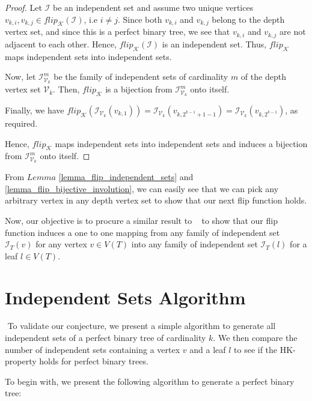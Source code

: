 \documentclass{amsart}
\theoremstyle{definition}
\begin{document}
\begin{proof}
  Let $\mathcal{I}$ be an independent set and assume two unique vertices $v_{k, i}, v_{k, j} \in flip_\mathcal{K}(\mathcal{I})$, i.e $i \neq j$. Since both $v_{k, i}$ and $v_{k, j}$ belong to the depth vertex set, and since this is a perfect binary tree, we see that $v_{k, i}$ and $v_{k, j}$ are not adjacent to each other. Hence, $flip_\mathcal{K}(\mathcal{I})$ is an independent set. Thus, $flip_\mathcal{K}$ maps independent sets into independent sets.

  Now, let $\mathcal{I}^m_{\mathcal{V}_k}$ be the family of independent sets of cardinality $m$ of the depth vertex set $\mathcal{V}_k$. Then, $flip_\mathcal{K}$ is a bijection from $\mathcal{I}^m_{\mathcal{V}_k}$ onto itself.

  Finally, we have $flip_\mathcal{K}(\mathcal{I}_{\mathcal{V}_k}(v_{k, 1})) = \mathcal{I}_{\mathcal{V}_k}(v_{k, 2^{k-1} + 1 - 1}) = \mathcal{I}_{\mathcal{V}_k}(v_{k, 2^{k-1}})$, as required.

  Hence, $flip_\mathcal{K}$ maps independent sets into independent sets and induces a bijection from $\mathcal{I}^m_{\mathcal{V}_k}$ onto itself.
\end{proof}

From $Lemma$ \ref{lemma_flip_independent_sets} and \ref{lemma_flip_bijective_involution}, we can easily see that we can pick any arbitrary vertex in any depth vertex set to show that our next flip function holds.

Now, our objective is to procure a similar result to ~\cite{MR4245360} to show that our flip function induces a one to one mapping from any family of independent set $\mathcal{I}_{T}(v)$ for any vertex $v \in V(T)$ into any family of independent set $\mathcal{I}_{T}(l)$ for a leaf $l \in V(T)$.
\newpage
\section{Independent Sets Algorithm}\label{coclique-algorithm}
$ $
To validate our conjecture, we present a simple algorithm to generate all independent sets of a perfect binary tree of cardinality $k$. We then compare the number of independent sets containing a vertex $v$ and a leaf $l$ to see if the HK-property holds for perfect binary trees.

To begin with, we present the following algorithm to generate a perfect binary tree:
\end{document}
